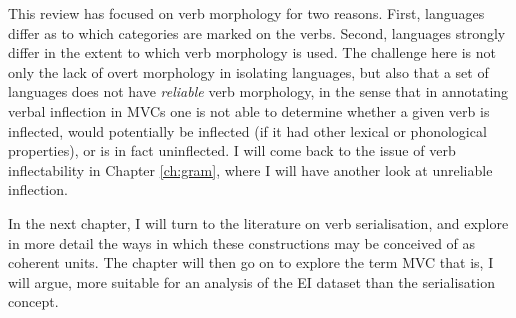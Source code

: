 This review has focused on verb morphology for two reasons. First, languages differ as to which categories are marked on the verbs. Second, languages strongly differ in the extent to which verb morphology is used. The challenge here is not only the lack of overt morphology in isolating languages, but also that a set of languages does not have \emph{reliable} verb morphology, in the sense that in annotating verbal inflection in MVCs one is not able to determine whether a given verb is inflected, would potentially be inflected (if it had other lexical or phonological properties), or is in fact uninflected. I will come back to the issue of verb inflectability in Chapter \ref{ch:gram}, where I will have another look at unreliable inflection.

In the next chapter, I will turn to the literature on verb serialisation, and explore in more detail the ways in which these constructions may be conceived of as coherent units. The chapter will then go on to explore the term MVC that is, I will argue, more suitable  for an analysis of the EI dataset than the serialisation concept.
